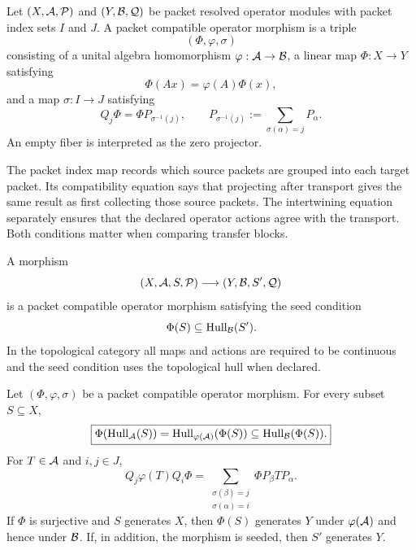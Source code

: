 \begin{definition}
\label{def:packet-morphism}
Let $(X,\mathcal A,\mathcal P)$ and $(Y,\mathcal B,\mathcal Q)$ be packet resolved operator modules with packet index sets $I$ and $J$.  A packet compatible operator morphism is a triple
\[
(\Phi,\varphi,\sigma)
\]
consisting of a unital algebra homomorphism $\varphi:\mathcal A\to\mathcal B$, a linear map $\Phi:X\to Y$ satisfying
\[
\Phi(Ax)=\varphi(A)\Phi(x),
\]
and a map $\sigma:I\to J$ satisfying
\[
Q_j\Phi
=
\Phi P_{\sigma^{-1}(j)},
\qquad
P_{\sigma^{-1}(j)}:=
\sum_{\sigma(\alpha)=j}P_\alpha.
\]
An empty fiber is interpreted as the zero projector.
\end{definition}

The packet index map records which source packets are grouped into each target packet.  Its compatibility equation says that projecting after transport gives the same result as first collecting those source packets.  The intertwining equation separately ensures that the declared operator actions agree with the transport.  Both conditions matter when comparing transfer blocks.

\begin{definition}
\label{def:seed-morphism}
A morphism
\[
(X,\mathcal A,S,\mathcal P)\longrightarrow(Y,\mathcal B,S',\mathcal Q)
\]
is a packet compatible operator morphism satisfying the seed condition
\[
\Phi(S)\subseteq\operatorname{Hull}_{\mathcal B}(S').
\]
In the topological category all maps and actions are required to be continuous and the seed condition uses the topological hull when declared.
\end{definition}

\begin{theorem}
\label{thm:naturality}
Let $(\Phi,\varphi,\sigma)$ be a packet compatible operator morphism.  For every subset $S\subseteq X$,
\[
\boxed{
\Phi(\operatorname{Hull}_{\mathcal A}(S))
=
\operatorname{Hull}_{\varphi(\mathcal A)}(\Phi(S))
\subseteq
\operatorname{Hull}_{\mathcal B}(\Phi(S)).
}
\]
For $T\in\mathcal A$ and $i,j\in J$,
\[
\boxed{
Q_j\varphi(T)Q_i\Phi
=
\sum_{\substack{\sigma(\beta)=j\\\sigma(\alpha)=i}}
\Phi P_\beta TP_\alpha.
}
\]
If $\Phi$ is surjective and $S$ generates $X$, then $\Phi(S)$ generates $Y$ under $\varphi(\mathcal A)$ and hence under $\mathcal B$.  If, in addition, the morphism is seeded, then $S'$ generates $Y$.
\end{theorem}

